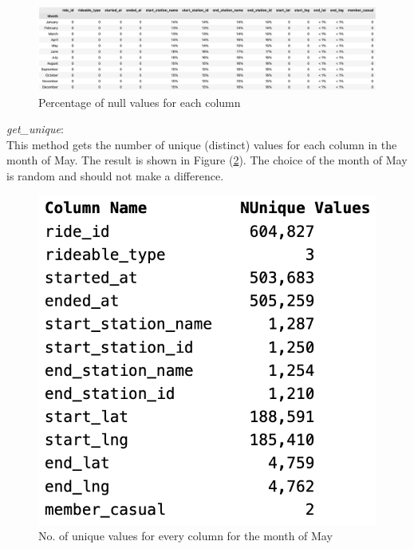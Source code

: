 \documentclass[12pt]{article}
\begin{document}
	\begin{figure}[h]
	\hspace{-0.5in}
	\includegraphics[scale=0.48]{imgNAN.png}
	\caption{Percentage of null values for each column}
	\label{fig4}
	\end{figure}
	
	\textit{get\_unique}:\\
	This method gets the number of unique (distinct) values for each column in the month of May. The result is shown in Figure (\ref{fig2}). The choice of the month of May is random and should not make a difference. 
	
	\begin{figure}[h]
	\centering
	\includegraphics[scale = 0.6]{imgUni.png} 
	\caption{No. of unique values for every column for the month of May}
	\label{fig2}
	\end{figure}
	
\end{document}
